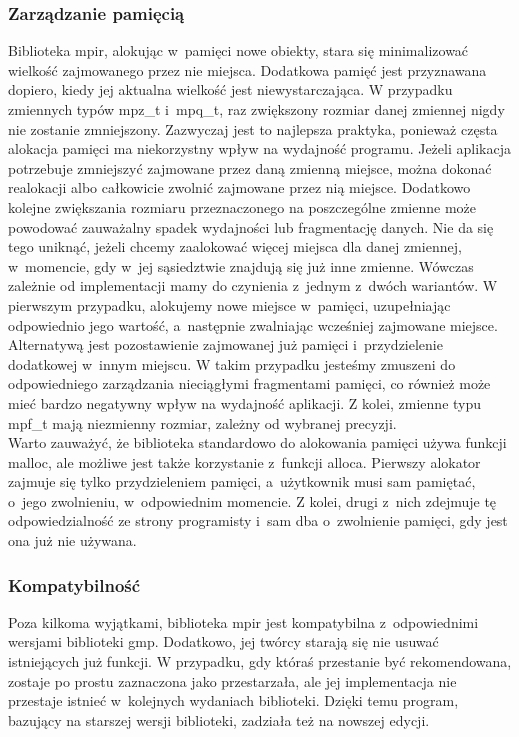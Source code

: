\subsubsection{Zarządzanie pamięcią}
Biblioteka mpir, alokując w~pamięci nowe obiekty, stara się minimalizować wielkość zajmowanego przez nie miejsca. Dodatkowa pamięć jest przyznawana dopiero, kiedy jej aktualna wielkość jest niewystarczająca. W przypadku zmiennych typów mpz\_t i~mpq\_t, raz zwiększony rozmiar danej zmiennej nigdy nie zostanie zmniejszony. Zazwyczaj jest to najlepsza praktyka, ponieważ częsta alokacja pamięci ma niekorzystny wpływ na wydajność programu. Jeżeli aplikacja potrzebuje zmniejszyć zajmowane przez daną zmienną miejsce, można dokonać realokacji albo całkowicie zwolnić zajmowane przez nią miejsce. Dodatkowo kolejne zwiększania rozmiaru przeznaczonego na poszczególne zmienne może powodować zauważalny spadek wydajności lub fragmentację danych. Nie da się tego uniknąć, jeżeli chcemy zaalokować więcej miejsca dla danej zmiennej, w~momencie, gdy w~jej sąsiedztwie znajdują się już inne zmienne. Wówczas zależnie od implementacji mamy do czynienia z~jednym z~dwóch wariantów. W pierwszym przypadku, alokujemy nowe miejsce w~pamięci, uzupełniając odpowiednio jego wartość, a~następnie zwalniając wcześniej zajmowane miejsce. Alternatywą jest pozostawienie zajmowanej już pamięci i~przydzielenie dodatkowej w~innym miejscu. W takim przypadku jesteśmy zmuszeni do odpowiedniego zarządzania nieciągłymi fragmentami pamięci, co również może mieć bardzo negatywny wpływ na wydajność aplikacji. Z kolei, zmienne typu mpf\_t mają niezmienny rozmiar, zależny od wybranej precyzji. \\
Warto zauważyć, że biblioteka standardowo do alokowania pamięci używa funkcji malloc, ale możliwe jest także korzystanie z~funkcji alloca. Pierwszy alokator zajmuje się tylko przydzieleniem pamięci, a~użytkownik musi sam pamiętać, o~jego zwolnieniu, w~odpowiednim momencie. Z kolei, drugi z~nich zdejmuje tę odpowiedzialność ze strony programisty i~sam dba o~zwolnienie pamięci, gdy jest ona już nie używana.

\subsubsection{Kompatybilność}
Poza kilkoma wyjątkami, biblioteka mpir jest kompatybilna z~odpowiednimi wersjami biblioteki gmp. Dodatkowo, jej twórcy starają się nie usuwać istniejących już funkcji. W przypadku, gdy któraś przestanie być rekomendowana, zostaje po prostu zaznaczona jako przestarzała, ale jej implementacja nie przestaje istnieć w~kolejnych wydaniach biblioteki. Dzięki temu program, bazujący na starszej wersji biblioteki, zadziała też na nowszej edycji.

